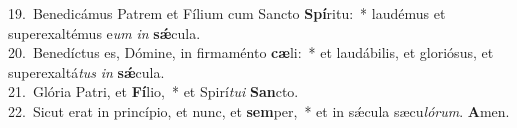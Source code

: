 {19.~}Benedicámus Patrem et Fílium cum Sancto \textbf{Spí}ritu:~* laudémus et superexaltémus e\textit{um} \textit{in} \textbf{sǽ}cula.\\
{20.~}Benedíctus es, Dómine, in firmaménto \textbf{cæ}li:~* et laudábilis, et gloriósus, et superexaltá\textit{tus} \textit{in} \textbf{sǽ}cula.\\
{21.~}Glória Patri, et \textbf{Fí}lio,~* et Spirí\textit{tu}\textit{i} \textbf{San}cto.\\
{22.~}Sicut erat in princípio, et nunc, et \textbf{sem}per,~* et in sǽcula sæcu\textit{ló}\textit{rum}. \textbf{A}men.\\
